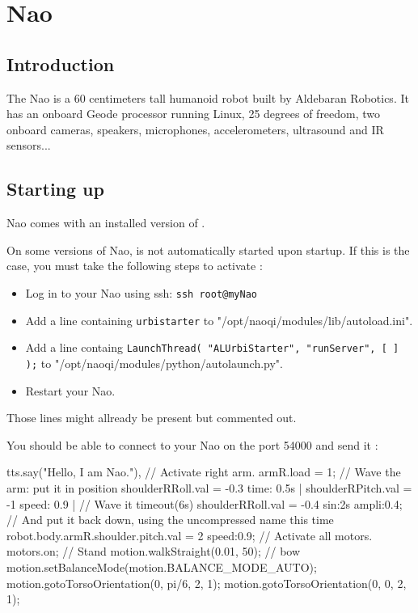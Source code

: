 \newcommand{\naoqi}{NaoQi\xspace}

\chapter{Nao}
\label{sec:nao}
\section{Introduction}

The Nao is a 60 centimeters tall humanoid robot built by Aldebaran Robotics.
It has an onboard Geode processor running Linux, 25 degrees of freedom,
two onboard cameras, speakers, microphones, accelerometers, ultrasound and IR
sensors...

\section{Starting up}

Nao comes with an installed version of \urbi.

On some versions of Nao, \urbi is not automatically started upon startup.
If this is the case, you must take the following steps to activate \urbi:

\begin{itemize}
\item Log in to your Nao using ssh: \lstinline|ssh root@myNao|
\item Add a line containing \lstinline|urbistarter| to
"/opt/naoqi/modules/lib/autoload.ini".
\item Add a line containg
\lstinline|LaunchThread( "ALUrbiStarter", "runServer", [ ] );| to "/opt/naoqi/modules/python/autolaunch.py".
\item Restart your Nao.
\end{itemize}

Those lines might allready be present but commented out.

You should be able to connect to your Nao on the port 54000 and send it \us:

\begin{urbiunchecked}
tts.say("Hello, I am Nao."),
// Activate right arm.
armR.load = 1;
// Wave the arm: put it in position
shoulderRRoll.val = -0.3 time: 0.5s |
shoulderRPitch.val = -1 speed: 0.9 |
// Wave it
timeout(6s) shoulderRRoll.val = -0.4 sin:2s ampli:0.4;
// And put it back down, using the uncompressed name this time
robot.body.armR.shoulder.pitch.val = 2 speed:0.9;
// Activate all motors.
motors.on;
// Stand
motion.walkStraight(0.01, 50);
// bow
motion.setBalanceMode(motion.BALANCE_MODE_AUTO);
motion.gotoTorsoOrientation(0, pi/6, 2, 1);
motion.gotoTorsoOrientation(0, 0, 2, 1);
\end{urbiunchecked}

